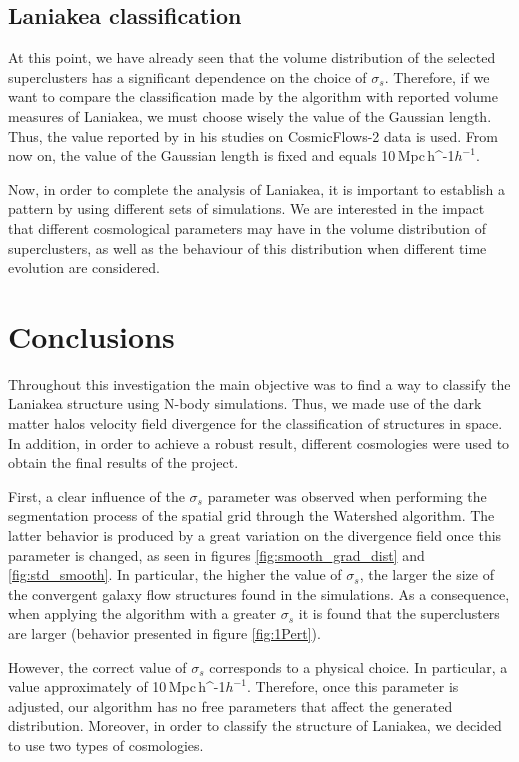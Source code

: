 \documentclass[usenatbib]{mnras}
\newcommand{\Mpch}{\,{\rm Mpc}\,\ifmmode h^{-1}\else $h^{-1}$\fi}
\begin{document}
\subsection{Laniakea classification}

At this point, we have already seen that the volume distribution of the selected superclusters has a significant dependence on the choice of $\sigma_s$. Therefore, if we want to compare the classification made by the algorithm with reported volume measures of Laniakea, we must choose wisely the value of the Gaussian length. Thus, the value reported by \cite{2014Natur.513...71T} in his studies on CosmicFlows-2 data is used. From now on, the value of the Gaussian length is fixed and equals 10\Mpch. 

Now, in order to complete the analysis of Laniakea, it is important to
establish a pattern by using different sets of simulations. We are
interested in the impact that different cosmological parameters may
have in the volume distribution of superclusters, as well as the
behaviour of this distribution when different time evolution are
considered. 




\section{Conclusions}
\label{sec:conclusions}


Throughout this investigation the main objective was to find a way to classify the Laniakea structure using N-body simulations. Thus, we made use of the dark matter halos velocity field divergence for the classification of structures in space. In addition, in order to achieve a robust result, different cosmologies were used to obtain the final results of the project.


First, a clear influence of the $\sigma_s$ parameter was observed when performing the segmentation process of the spatial grid through the Watershed algorithm. The latter behavior is produced by a great variation on the divergence field once this parameter is changed, as seen in figures \ref{fig:smooth_grad_dist} and \ref{fig:std_smooth}. In particular, the higher the value of $\sigma_s$, the larger the size of the convergent galaxy flow structures found in the simulations. As a consequence, when applying the algorithm with a greater $\sigma_s$ it is found that the superclusters are larger (behavior presented in figure \ref{fig:1Pert}).

However, the correct value of $\sigma_s$ corresponds to a physical choice. In particular, a value approximately of 10\Mpch. Therefore, once this parameter is adjusted, our algorithm has no free parameters that affect the generated distribution. Moreover, in order to classify the structure of Laniakea, we decided to use two types of cosmologies. 
\end{document}
